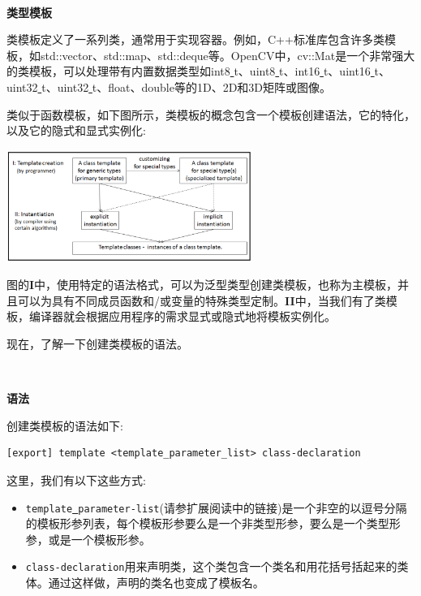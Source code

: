 \noindent\textbf{}\ \par
\textbf{类型模板} \ \par
类模板定义了一系列类，通常用于实现容器。例如，C++标准库包含许多类模板，如std::vector、std::map、std::deque等。OpenCV中，cv::Mat是一个非常强大的类模板，可以处理带有内置数据类型如int8\underline{ }t、uint8\underline{ }t、int16\underline{ }t、uint16\underline{ }t、uint32\underline{ }t、uint32\underline{ }t、float、double等的1D、2D和3D矩阵或图像。 \par
类似于函数模板，如下图所示，类模板的概念包含一个模板创建语法，它的特化，以及它的隐式和显式实例化: \par

\begin{center}
	\includegraphics[width=0.6\textwidth]{content/Section-1/Chapter-4/2}
\end{center}

图的\textbf{I}中，使用特定的语法格式，可以为泛型类型创建类模板，也称为主模板，并且可以为具有不同成员函数和/或变量的特殊类型定制。\textbf{II}中，当我们有了类模板，编译器就会根据应用程序的需求显式或隐式地将模板实例化。\par
现在，了解一下创建类模板的语法。 \par

\noindent\textbf{}\ \par
\textbf{语法} \ \par
创建类模板的语法如下: \par

\begin{lstlisting}[caption={}]
[export] template <template_parameter_list> class-declaration
\end{lstlisting}

这里，我们有以下这些方式: \par

\begin{itemize}
	\item \texttt{template\underline{ }parameter-list}(请参扩展阅读中的链接)是一个非空的以逗号分隔的模板形参列表，每个模板形参要么是一个非类型形参，要么是一个类型形参，或是一个模板形参。
	\item \texttt{class-declaration}用来声明类，这个类包含一个类名和用花括号括起来的类体。通过这样做，声明的类名也变成了模板名。
\end{itemize}

